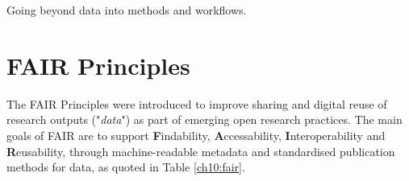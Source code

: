 Going beyond data into methods and workflows.





\section{FAIR Principles}
\label{ch10:fair-principles}

The \acrshort{FAIR} Principles \cite{Wilkinson 2016} were introduced to improve sharing and digital reuse of research outputs ("\emph{data}") as part of emerging open research practices. The main goals of FAIR are to support \textbf{F}indability, \textbf{A}ccessability, \textbf{I}nteroperability and \textbf{R}eusability, through machine-readable metadata and standardised publication methods for data, as quoted in Table \vref{ch10:fair}.

